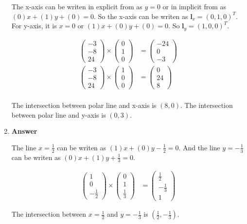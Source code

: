 \documentclass[11pt]{article}
\begin{document}
\begin{enumerate}
The x-axis can be writen in explicit from as $y = 0$ or in implicit from as $(0)x + (1)y + (0) = 0$. So the x-axis can be writen as $\mathbf{l}_x = (0, 1, 0)^T$. For y-axis, it is $x = 0$ or $(1)x + (0)y + (0) = 0$. So $\mathbf{l}_y = (1, 0, 0)^T$.

\begin{align*}
\begin{pmatrix}
-3\\
-8\\
24
\end{pmatrix}
\times
\begin{pmatrix}
0\\
1\\
0
\end{pmatrix}
&= 
\begin{pmatrix}
-24\\
0\\
-3
\end{pmatrix}\\
\begin{pmatrix}
-3\\
-8\\
24
\end{pmatrix}
\times
\begin{pmatrix}
1\\
0\\
0
\end{pmatrix}
&= 
\begin{pmatrix}
0\\
24\\
8
\end{pmatrix}\\
\end{align*}

The intersection between polar line and x-axis is $(8,0)$. The intersection between polar line and y-axis is $(0,3)$.

\item 
\noindent\textbf{Answer}

The line $x=\frac{1}{2}$ can be writen as $(1)x + (0)y - \frac{1}{2} = 0$. And the line $y=-\frac{1}{3}$ can be writen as $(0)x + (1)y + \frac{1}{3} = 0$. 

\begin{align*}
\begin{pmatrix}
1\\
0\\
- \frac{1}{2}
\end{pmatrix}
\times
\begin{pmatrix}
0\\
1\\
\frac{1}{3}
\end{pmatrix}
&= 
\begin{pmatrix}
\frac{1}{2}\\
-\frac{1}{3}\\
1
\end{pmatrix}
\end{align*}

The intersection between $x=\frac{1}{2}$ and $y=-\frac{1}{3}$ is $(\frac{1}{2}, -\frac{1}{3})$.

\end{enumerate}
\end{document}
